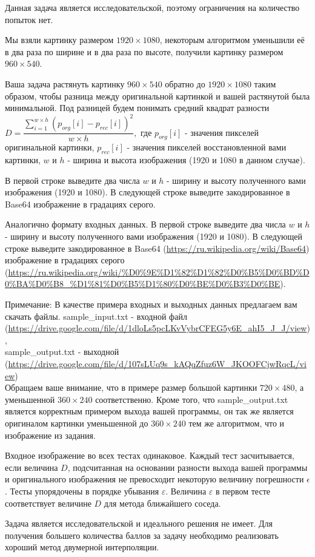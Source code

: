 
Данная задача является исследовательской, поэтому ограничения на количество попыток нет.

Мы взяли картинку размером $1920\times1080$, некоторым алгоритмом уменьшили её в два раза по ширине 
и в два раза по высоте, получили картинку размером $ 960\times540 $. 

Ваша задача растянуть картинку $ 960\times540 $ обратно до $ 1920\times1080 $ таким образом, 
чтобы разница между оригинальной картинкой и вашей растянутой была минимальной. Под разницей 
будем понимать средний квадрат разности $ D=\dfrac{\sum\limits_{i=1}^{w\times h} (p_{org}[i] - p_{rec}[i])^2}{w\times h},$ 
где $ p_{org}[i]$ - значения пикселей оригинальной картинки, $ p_{rec}[i] $ - значения пикселей восстановленной вами картинки, $ w $ и $ h $
- ширина и высота изображения (1920 и 1080 в данном случае).


В первой строке выведите два числа $ w $ и $ h $ - ширину и высоту полученного вами изображения 
(1920 и 1080). В следующей строке выведите закодированное в Base64 изображение в градациях серого.

\outputfmtSection

Аналогично формату входных данных. В первой строке выведите два числа $ w $ и $ h $ - ширину и высоту 
полученного вами изображения (1920 и 1080). В следующей строке выведите закодированное в 
Base64 (\url{https://ru.wikipedia.org/wiki/Base64}) изображение в градациях серого (\url{https://ru.wikipedia.org/wiki/%D0%9E%D1%82%D1%82%D0%B5%D0%BD%D0%BA%D0%B8_%D1%81%D0%B5%D1%80%D0%BE%D0%B3%D0%BE}).

Примечание: В качестве примера входных и выходных данных предлагаем вам скачать файлы. sample\_input.txt  - 
входной файл\\
(\url{https://drive.google.com/file/d/1dloLs5pcLKvVybrCFEG5y6E_ahI5_J_J/view}), \\
sample\_output.txt - выходной\\ (\url{https://drive.google.com/file/d/107sLUq9s_kAQqZfuz6W_JKOOFCjwRqcL/view}) \\
Обращаем ваше внимание, что в примере размер большой картинки $720 \times 480$, 
а уменьшенной $360\times 240$ соответственно. Кроме того, что sample\_output.txt является 
корректным примером выхода вашей программы, он так же является оригиналом картинки уменьшенной до $360\times 240$ тем же алгоритмом, 
что и изображение из задания.

Входное изображение во всех тестах одинаковое. Каждый тест засчитывается, если величина $D$, подсчитанная на основании разности 
выхода вашей программы и оригинального изображения не превосходит некоторую величину погрешности $\epsilon$. Тесты упорядочены в порядке 
убывания $\varepsilon$. Величина $\varepsilon$ в первом тесте соответствует величине $D$ для метода ближайшего соседа.

\solutionSection

Задача является исследовательской и идеального решения не имеет. Для получения большего количества баллов за задачу необходимо реализовать хороший метод двумерной интерполяции. 